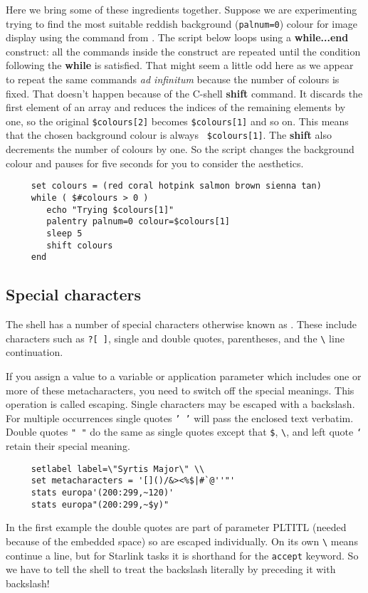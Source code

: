 Here we bring some of these ingredients together.  Suppose we are
experimenting trying to find the most suitable reddish background
({\tt{palnum=0}}) colour for image display using the 
 command
from \KAPPAref\@.  The script below loops using a {\bf while...end}
construct: all the commands inside the construct are repeated until the
condition following the {\bf while} is satisfied.  That might seem a
little odd here as we appear to repeat the same commands {\em ad
infinitum} because the number of colours is fixed.  That doesn't happen
because of the C-shell {\bf shift} command.  It discards the first
element of an array and reduces the indices of the remaining elements by
one, so the original {\tt \$colours[2]} becomes {\tt \$colours[1]} and
so on.  This means that the chosen background colour is always {\tt
\$colours[1]}.  The {\bf shift} also decrements the number of colours by
one.  So the script changes the background colour and pauses for five
seconds for you to consider the aesthetics.

\small
\begin{verbatim}
     set colours = (red coral hotpink salmon brown sienna tan)
     while ( $#colours > 0 )
        echo "Trying $colours[1]"
        palentry palnum=0 colour=$colours[1]
        sleep 5
        shift colours
     end
\end{verbatim}
\normalsize


\subsection{Special characters
\label{sc4_se_spec_char}}

The shell has a number of special characters otherwise known as
.  These include
 characters such as {\tt *?[~]},
single and double quotes, parentheses, and the \verb+\+ line
continuation.

If you assign a value to a variable or application parameter which
includes one or more of these metacharacters, you need to switch off
the special meanings.  This operation is called escaping.
Single characters may be escaped with a backslash.  For multiple
occurrences single quotes {\tt '~'} will pass the enclosed text
verbatim.  Double quotes {\tt "~"} do the same as single quotes except
that {\tt \$}, \verb+\+, and left quote {\tt `} retain their special
meaning.  

\small
\begin{verbatim}
     setlabel label=\"Syrtis Major\" \\
     set metacharacters = '[]()/&><%$|#`@''"'
     stats europa'(200:299,~120)'
     stats europa"(200:299,~$y)"
\end{verbatim}
\normalsize
In the first example the double quotes are part of parameter PLTITL
(needed because of the embedded space) so are escaped individually.  On
its own \verb+\+ means continue a line, but for Starlink tasks it is
shorthand for the {\tt accept} keyword.  So we have to tell the shell to
treat the backslash literally by preceding it with backslash!  


